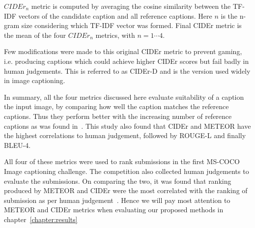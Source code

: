 $CIDEr_n$ metric is computed by averaging the cosine similarity between
the TF-IDF vectors of the candidate caption and all reference captions.
Here $n$ is the n-gram size considering which TF-IDF vector was formed.
Final CIDEr metric is the mean of the four $CIDEr_n$ metrics, with $n=1\cdots4$.

Few modifications were made to this original CIDEr metric to prevent gaming,
i.e.  producing captions which could achieve higher CIDEr scores but fail badly
in human judgements.
This is referred to as CIDEr-D and is the version used widely in image
captioning.


In summary, all the four metrics discussed here evaluate suitability of a
caption the input image, by comparing how well the caption matches the reference
captions.
Thus they perform better with the increasing number of reference captions as was
found in~\cite{Vedantam_2015_CVPR}.
This study also found that CIDEr and METEOR have the highest correlations to
human judgement, followed by ROUGE-L and finally BLEU-4.

All four of these metrics were used to rank submissions in the first MS-COCO
Image captioning challenge.
The competition also collected human judgements to evaluate the submissions.
%
On comparing the two, it was found that ranking produced by METEOR and CIDEr
were the most correlated with the ranking of submission as per human
judgement~\cite{lsun2015CaptionSlides}.
Hence we will pay most attention to METEOR and CIDEr metrics when evaluating our
proposed methods in chapter~\ref{chapter:results}
